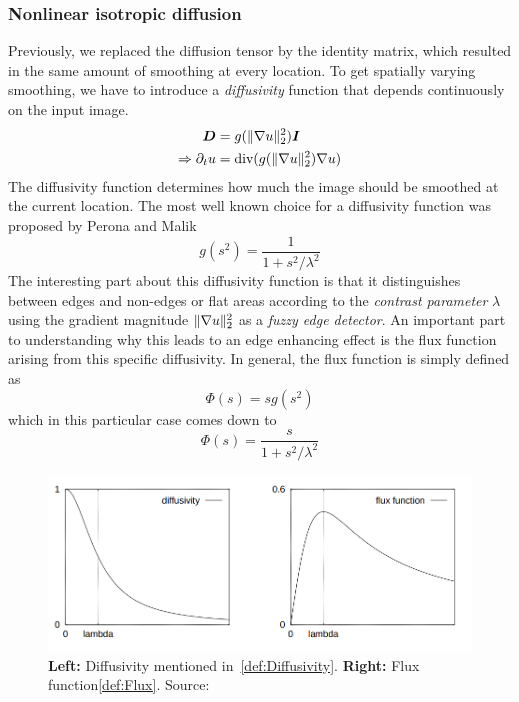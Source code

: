 \subsubsection*{Nonlinear isotropic diffusion}\label{sub:NonIsoDiff}
Previously, we replaced the diffusion tensor by the identity matrix, which resulted in the same
amount of smoothing at every location.
To get spatially varying smoothing, we have to introduce a \textit{diffusivity} function that
depends continuously on the input image. 
\begin{align}
    \boldsymbol D &= g(\lVert\mathbf{\nabla} u\rVert_2^2)\boldsymbol I\\
    \Rightarrow \partial_t u & = \textnormal{div}(g(\lVert\mathbf{\nabla}
    u\rVert_2^2)\mathbf{\nabla} u)\label{eq:NonIsoDiff}
\end{align}
The diffusivity function determines how much the image should be smoothed at the current location.
The most well known choice for a diffusivity function was proposed by Perona and Malik 
\cite{perona-malik}
\begin{equation}
    g(s^2) = \frac{1}{1 + s^2/\lambda^2}\label{def:Diffusivity}
\end{equation}
The interesting part about this diffusivity function is that it distinguishes between edges and
non-edges or flat areas according to the \textit{contrast parameter} $\lambda$ using the gradient
magnitude $\lVert\mathbf{\nabla} u\rVert_2^2$ as a \textit{fuzzy edge detector}\cite{dic}. An important part
to understanding why this leads to an edge enhancing effect is the flux function
arising from this specific diffusivity. In general, the flux function is simply defined as 
\begin{equation}
    \Phi(s) = sg(s^2)
\end{equation}
which in this particular case comes down to
\begin{equation}
    \Phi(s) =\frac{s}{1 + s^2/\lambda^2}\label{def:Flux}
\end{equation}
\begin{figure}
    \includegraphics[width=\linewidth]{../Images/diffflux.png}
    \caption{\textbf{Left:} Diffusivity mentioned in~\eqref{def:Diffusivity}. \textbf{Right:} Flux
    function\eqref{def:Flux}. Source: \cite{dic}}\label{fig:DiffFlux}
\end{figure}
